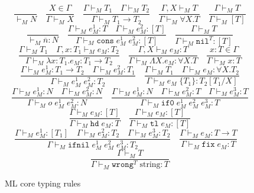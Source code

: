 \begin{figure}[t]
\[
\frac{}{\vdash_{M}N}
\quad
\frac{X\in\Gamma}{\Gamma\vdash_{M}X}
\quad
\frac{\Gamma\vdash_{M}T_{1}\quad\Gamma\vdash_{M}T_{2}}{\Gamma\vdash_{M}T_{1}\rightarrow T_{2}}
\quad
\frac{\Gamma,X\vdash_{M}T}{\Gamma\vdash_{M}\forall X.T}
\quad
\frac{\Gamma\vdash_{M}T}{\Gamma\vdash_{M}[T]}
\]
\bigskip
\[
\frac{}{\vdash_{M}\overline{n}:N}
\quad
\frac{\Gamma\vdash_{M}e_{M}^{1}:T\quad\Gamma\vdash_{M}e_{M}^{2}:[T]}{\Gamma\vdash_{M}\mathtt{cons}\;e_{M}^{1}\;e_{M}^{2}:[T]}
\quad
\frac{\Gamma\vdash_{M}T}{\Gamma\vdash_{M}\mathtt{nil}^{T}:[T]}
\]
\[
\frac{\Gamma\vdash_{M}T_{1}\quad\Gamma,x:T_{1}\vdash_{M}e_{M}:T_{2}}{\Gamma\vdash_{M}\lambda x:T_{1}.e_{M}:T_{1}\rightarrow T_{2}}
\quad
\frac{\Gamma,X\vdash_{M}e_{M}:T}{\Gamma\vdash_{M}\Lambda X.e_{M}:\forall X.T}
\quad
\frac{x:T\in\Gamma}{\Gamma\vdash_{M}x:T}
\]
\[
\frac{\Gamma\vdash_{M}e_{M}^{1}:T_{1}\rightarrow T_{2}\quad\Gamma\vdash_{M}e_{M}^{2}:T_{1}}{\Gamma\vdash_{M}e_{M}^{1}\;e_{M}^{2}:T_{2}}
\quad
\frac{\Gamma\vdash_{M}T_{1}\quad\Gamma\vdash_{M}e_{M}:\forall X.T_{2}}{\Gamma\vdash_{M}e_{M}\;\lbrace T_{1}\rbrace:T_{2}[T_{1}/X]}
\]
\[
\frac{\Gamma\vdash_{M}e_{M}^{1}:N\quad\Gamma\vdash_{M}e_{M}^{2}:N}{\Gamma\vdash_{M}o\;e_{M}^{1}\;e_{M}^{2}:N}
\quad
\frac{\Gamma\vdash_{M}e_{M}^{1}:N\quad\Gamma\vdash_{M}e_{M}^{2}:T\quad\Gamma\vdash_{M}e_{M}^{3}:T}{\Gamma\vdash_{M}\mathtt{if0}\;e_{M}^{1}\;e_{M}^{2}\;e_{M}^{3}:T}
\]
\[
\frac{\Gamma\vdash_{M}e_{M}:[T]}{\Gamma\vdash_{M}\mathtt{hd}\;e_{M}:T}
\quad
\frac{\Gamma\vdash_{M}e_{M}:[T]}{\Gamma\vdash_{M}\mathtt{tl}\;e_{M}:[T]}
\]
\[
\frac{\Gamma\vdash_{M}e_{M}^{1}:[T_{1}]\quad\Gamma\vdash_{M}e_{M}^{2}:T_{2}\quad\Gamma\vdash_{M}e_{M}^{3}:T_{2}}{\Gamma\vdash_{M}\mathtt{ifnil}\;e_{M}^{1}\;e_{M}^{2}\;e_{M}^{3}:T_{2}}
\quad
\frac{\Gamma\vdash_{M}e_{M}:T\rightarrow T}{\Gamma\vdash_{M}\mathtt{fix}\;e_{M}:T}
\quad
\]
\[
\frac{\Gamma\vdash_{M}T}{\Gamma\vdash_{M}\mathtt{wrong}^{T}\;\mathrm{string}:T}
\]
\caption{ML core typing rules}
\label{mctr}
\end{figure}